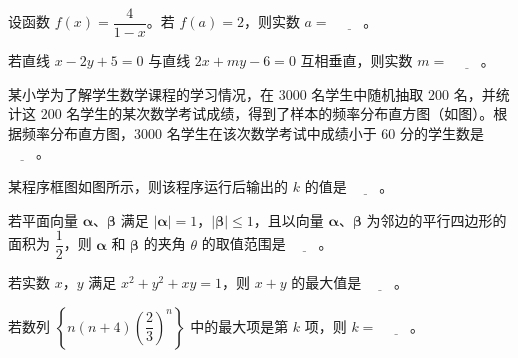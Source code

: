\begin{question}
设函数 $f(x)=\dfrac4{1-x}$。若 $f(a)=2$，则实数 $a=$ $\underline{\qquad}$。

\end{question}
\begin{question}
若直线 $x-2y+5=0$ 与直线 $2x+my-6=0$ 互相垂直，则实数 $m=$ $\underline{\qquad}$。

\Needspace{0.4\textheight}
\end{question}
\begin{question}
某小学为了解学生数学课程的学习情况，在 $3000$ 名学生中随机抽取 $200$ 名，并统计这 $200$ 名学生的某次数学考试成绩，得到了样本的频率分布直方图（如图）。根据频率分布直方图，$3000$ 名学生在该次数学考试中成绩小于 $60$ 分的学生数是 $\underline{\qquad}$。
\nopagebreak[4]
\begin{center}\end{center}
\nopagebreak[4]
\Needspace{0.4\textheight}
\end{question}
\begin{question}
某程序框图如图所示，则该程序运行后输出的 $k$ 的值是 $\underline{\qquad}$。
\nopagebreak[4]
\begin{center}\end{center}
\nopagebreak[4]
\end{question}
\begin{question}
若平面向量 $\boldsymbol\alpha$、$\boldsymbol\beta$ 满足 $|\boldsymbol\alpha|=1$，$|\boldsymbol\beta|\leqslant1$，且以向量 $\boldsymbol\alpha$、$\boldsymbol\beta$ 为邻边的平行四边形的面积为 $\dfrac12$，则 $\boldsymbol\alpha$ 和 $\boldsymbol\beta$ 的夹角 $\theta$ 的取值范围是 $\underline{\qquad}$。

\end{question}
\begin{question}
若实数 $x$，$y$ 满足 $x^2+y^2+xy=1$，则 $x+y$ 的最大值是 $\underline{\qquad}$。

\end{question}
\begin{question}
若数列 $\left\{n(n+4)\left(\dfrac23\right)^n\right\}$ 中的最大项是第 $k$ 项，则 $k=$ $\underline{\qquad}$。

\end{question}


